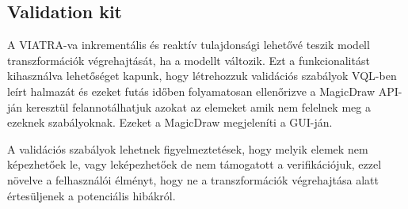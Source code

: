 \subsection{Validation kit}

A VIATRA-va inkrementális és reaktív tulajdonsági lehetővé teszik modell transzformációk végrehajtását, ha a modellt változik. Ezt a funkcionalitást kihasználva lehetőséget kapunk, hogy létrehozzuk validációs szabályok VQL-ben leírt halmazát és ezeket futás időben folyamatosan ellenőrizve a MagicDraw API-ján keresztül felannotálhatjuk azokat az elemeket amik nem felelnek meg a ezeknek szabályoknak. Ezeket a MagicDraw megjeleníti a GUI-ján. 

A validációs szabályok lehetnek figyelmeztetések, hogy melyik elemek nem képezhetőek le, vagy leképezhetőek de nem támogatott a verifikációjuk, ezzel növelve a felhasználói élményt, hogy ne a transzformációk végrehajtása alatt értesüljenek a potenciális hibákról.




